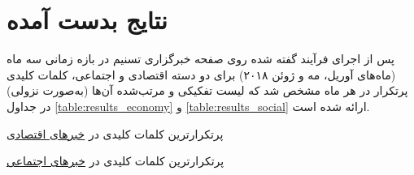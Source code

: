 \documentclass[a4paper, 12pt]{article}
\begin{document}
\section{نتایج بدست آمده}
پس از اجرای فرآیند گفته شده روی صفحه خبرگزاری تسنیم در بازه زمانی سه ماه (ماه‌های آوریل، مه و ژوئن ۲۰۱۸) برای دو دسته اقتصادی و اجتماعی، کلمات کلیدی پرتکرار در هر ماه مشخص شد که لیست تفکیکی و مرتب‌شده آن‌ها (به‌صورت نزولی) در جداول \ref{table:results_economy} و  \ref{table:results_social}  ارائه شده است.

\begin{table}
    \caption{پرتکرارترین کلمات کلیدی در \underline{خبرهای اقتصادی}}
    \label{table:results_economy}
\begin{center}
\end{center}
\end{table}

\begin{table}
    \caption{پرتکرارترین کلمات کلیدی در \underline{خبرهای اجتماعی}}
    \label{table:results_social}
\begin{center}
\end{center}
\end{table}
\end{document}
